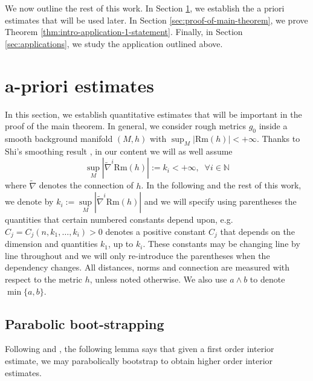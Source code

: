 \documentclass[12pt]{amsart}
\theoremstyle{plain}
\theoremstyle{plain}
\theoremstyle{definition}
\theoremstyle{remark}
\numberwithin{equation}{subsection}
\newcommand{\hdel}{\tilde{\nabla}}
\begin{document}
We now outline the rest of this work. In Section \ref{sec:a-priori-estimates}, we establish the a priori estimates that will be used later. In Section \ref{sec:proof-of-main-theorem}, we prove Theorem \ref{thm:intro-application-1-statement}. Finally, in Section \ref{sec:applications}, we study the application outlined above.




\section{a-priori estimates}\label{sec:a-priori-estimates}


In this section, we establish quantitative estimates that will be important in the proof of the main theorem. In general, we consider rough metrics $g_0$ inside a smooth background manifold $(M,h)$ with $\sup_M|\mathrm{Rm}(h)|<+\infty$. Thanks to Shi's smoothing result \cite{shi_deforming_1989}, in our content we will as well assume  
\begin{equation}\label{eqn:h-remark-curvature-estimates}
  \sup\limits_{M}|\hdel^i\text{Rm}(h)|:=k_i<+\infty,\;\; \forall i\in \mathbb{N}
\end{equation}
where $\hdel$ denotes the connection of $h$. In the following and the rest of this work, we denote by $k_i := \sup\limits_M|\hdel^i\text{Rm}(h)|$ and we will specify using parentheses the quantities that certain numbered constants depend upon, e.g. $C_j = C_j(n,k_1,\dots,k_i) > 0$ denotes a positive constant $C_j$ that depends on the dimension and quantities $k_1$, up to $k_i$. These constants may be changing line by line throughout and we will only re-introduce the parentheses when the dependency changes. All distances, norms and connection are measured with respect to the metric $h$, unless noted otherwise. We also use $a\wedge b$ to denote $\min\{a,b\}$.

\subsection{Parabolic boot-strapping}

Following \cite{shi_deforming_1989} and \cite{simon_deformation_2002}, the following lemma says that given a first order interior estimate, we may parabolically bootstrap to obtain higher order interior estimates.
\end{document}
